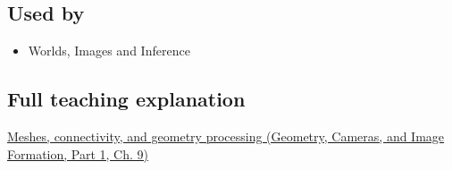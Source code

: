 \subsection{Used by}\label{appendix-1dd4ad54ca57-used-by}

\hypertarget{appendix-1dd4ad54ca57-used-by}{}

\begin{itemize}
\tightlist
\item
  {Worlds, Images and Inference}
\end{itemize}

\subsection{Full teaching explanation}\label{appendix-1dd4ad54ca57-full-teaching-explanation}

\hypertarget{appendix-1dd4ad54ca57-full-teaching-explanation}{}

\href{../03-Geometry-Cameras-and-Image-Formation-P01/main.pdf\#nameddest=03-visual-computing-i-ch002-meshes-connectivity-and-geometry-processing}{Meshes, connectivity, and geometry processing (Geometry, Cameras, and Image Formation, Part 1, Ch. 9)}
